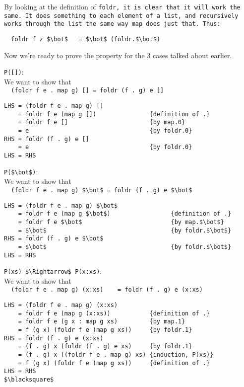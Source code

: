\documentclass{article}
\begin{document}
\noindent By looking at the definition of \tt foldr\rm, it is clear that it will work the same.
It does something to each element of a list, and recursively works through the list
the same way map does just that.
Thus:
\begin{lstlisting}
  foldr f z $\bot$   = $\bot$ (foldr.$\bot$)
\end{lstlisting}

\noindent Now we're ready to prove the property for the 3 cases talked about earlier.\\

\pagebreak

\indent \lstinline{P([])}:\\
We want to show that\\ \lstinline{  (foldr f e . map g) [] = foldr (f . g) e []}
\begin{lstlisting}
LHS = (foldr f e . map g) []
    = foldr f e (map g [])               {definition of .}
    = foldr f e []                       {by map.0}
    = e                                  {by foldr.0}
RHS = foldr (f . g) e []
    = e                                  {by foldr.0}
LHS = RHS
\end{lstlisting}


\indent \lstinline{P($\bot$)}:\\
We want to show that\\ 
\lstinline{  (foldr f e . map g) $\bot$ = foldr (f . g) e $\bot$}
\begin{lstlisting}
LHS = (foldr f e . map g) $\bot$
    = foldr f e (map g $\bot$)                 {definition of .}
    = foldr f e $\bot$                         {by map.$\bot$}
    = $\bot$                                   {by foldr.$\bot$}
RHS = foldr (f . g) e $\bot$
    = $\bot$                                   {by foldr.$\bot$}
LHS = RHS
\end{lstlisting}

\indent \lstinline{P(xs) $\Rightarrow$ P(x:xs)}:\\
We want to show that\\
\lstinline{  (foldr f e . map g) (x:xs)    = foldr (f . g) e (x:xs)}
\begin{lstlisting}
LHS = (foldr f e . map g) (x:xs)
    = foldr f e (map g (x:xs))           {definition of .}
    = foldr f e (g x : map g xs)         {by map.1}
    = f (g x) (foldr f e (map g xs))     {by foldr.1}
RHS = foldr (f . g) e (x:xs)
    = (f . g) x (foldr (f . g) e xs)     {by foldr.1}
    = (f . g) x ((foldr f e . map g) xs) {induction, P(xs)}
    = f (g x) (foldr f e (map g xs))     {definition of .}
LHS = RHS
$\blacksquare$
\end{lstlisting}
\end{document}
